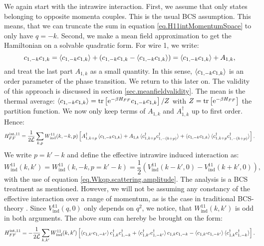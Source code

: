 We again start with the intrawire interaction. First, we assume that only states belonging to opposite momenta couples. This is the usual BCS assumption. This means, that we can truncate the sum in equation \eqref{eq.H11intMomentumSpace} to only have $q = -k$. Second, we make a mean field approximation to get the Hamiltonian on a solvable quadratic form. For wire 1, we write:
\begin{equation}
c_{1, -k}c_{1, k} = \braket{ c_{1, -k}c_{1, k} } + \left(c_{1, -k} c_{1, k} - \braket{ c_{1, -k}c_{1, k} } \right) = \braket{ c_{1, -k}c_{1, k} } + A_{1,k}, \nonumber 
\end{equation}
and treat the last part $A_{1,k}$ as a small quantity. In this sense, $\braket{ c_{1, -k}c_{1, k} }$ is an order parameter of the phase transition. We return to this later on. The validity of this approach is discussed in section \ref{sec.meanfieldvalidity}. The mean is the thermal average: $\braket{ c_{1, -k}c_{1, k} } = \operatorname{tr}\left[\text{e}^{-\beta H_{FF}}c_{1, -k}c_{1, k} \right]/Z$ with $Z = \operatorname{tr}\left[\text{e}^{-\beta H_{FF}}\right]$ the partition function. We now only keep terms of $A_{1,k}$ and $A^\dagger_{1,k}$ up to first order. Hence:
\begin{equation}
H^\text{int,11}_{FF} = \frac{1}{2\mathcal{L}} \sum_{k, p} W^{11}_{\text{ind}}(k, -k, p)\left[A^\dagger_{1, k + p}\braket{c_{1, -k}c_{1,k}} + A_{1, k}\braket{c^\dagger_{1, k + p}c^\dagger_{1, -(k+p)}} + \braket{c_{1, -k}c_{1,k}}\braket{c^\dagger_{1, k + p}c^\dagger_{1, -(k + p)}}\right]. 
\label{eq.H11int.meanfield.firstexpression}
\end{equation}
We write $p = k' - k$ and define the effective intrawire induced interaction as:
\begin{equation}
W^{11}_{\text{ind}}(k, k') = W^{11}_{\text{ind}}(k, -k, p = k' - k) = \frac{1}{2}\left(V^{11}_{\text{ind}}\left( k - k', 0 \right) - V^{11}_{\text{ind}}\left( k + k', 0 \right) \right), 
\label{eq.EffectiveInteraction.intrawire}
\end{equation}
with the use of equation \eqref{eq.Wkqp.scattering.amplitude}. The analysis is a BCS treatment as mentioned. However, we will not be assuming any constancy of the effective interaction over a range of momentum, as is the case in traditional BCS-theory \cite[chapter 3]{Tinkham}. Since $V^{11}_{\text{ind}}(q,0)$ only depends on $q^2$, we notice, that $W^{11}_{\text{ind}}(k, k')$ is odd in both arguments. The above sum can hereby be brought on the form:
\begin{equation}
H^\text{int,11}_{FF} = -\frac{1}{2\mathcal{L}}\sum_{k,k'} W^{11}_{\text{ind}}(k, k')\left[ \braket{ c_{1, k'}c_{1, -k'}} c^\dagger_{1,k} c^\dagger_{1, -k} + \braket {c^\dagger_{1, k'}c^\dagger_{1, -k'}} c_{1, k} c_{1, -k} - \braket {c_{1, k'}c_{1, -k'}} \braket {c^\dagger_{1, k}c^\dagger_{1, -k}} \right]. \nonumber
\end{equation}
